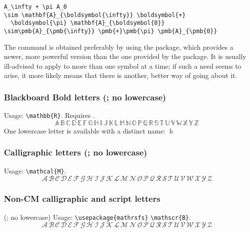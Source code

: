 \begin{verbatim}
A_\infty + \pi A_0
\sim \mathbf{A}_{\boldsymbol{\infty}} \boldsymbol{+}
  \boldsymbol{\pi} \mathbf{A}_{\boldsymbol{0}}
\sim\pmb{A}_{\pmb{\infty}} \pmb{+}\pmb{\pi} \pmb{A}_{\pmb{0}}
\end{verbatim}
The  command is obtained preferably by using
the  package, which provides a newer, more powerful version than
the one provided by the  package. It is usually
ill-advised to apply  to more than one symbol at a time;
if such a need seems to arise, it more likely means that there is
another, better way of going about it.

\subsubsection{Blackboard Bold letters (; no lowercase)}
 Usage: \verb'\mathbb{R}'.  Requires .
\[
\mathbb{A}\,\mathbb{B}\,\mathbb{C}\,\mathbb{D}\,\mathbb{E}\,\mathbb{F}
\,\mathbb{G}\,\mathbb{H}\,\mathbb{I}\,\mathbb{J}\,\mathbb{K}\,\mathbb{L}
\,\mathbb{M}\,\mathbb{N}\,\mathbb{O}\,\mathbb{P}\,\mathbb{Q}\,\mathbb{R}
\,\mathbb{S}\,\mathbb{T}\,\mathbb{U}\,\mathbb{V}\,\mathbb{W}\,\mathbb{X}
\,\mathbb{Y}\,\mathbb{Z}
\]
One lowercase letter is available with a distinct name:\qquad
$\Bbbk$\quad {}


\subsubsection{Calligraphic letters (; no lowercase)} Usage:
\verb'\mathcal{M}'.
\[
\mathcal{A}\,\mathcal{B}\,\mathcal{C}\,\mathcal{D}\,\mathcal{E}
\,\mathcal{F}\,\mathcal{G}\,\mathcal{H}\,\mathcal{I}\,\mathcal{J}
\,\mathcal{K}\,\mathcal{L}\,\mathcal{M}\,\mathcal{N}\,\mathcal{O}
\,\mathcal{P}\,\mathcal{Q}\,\mathcal{R}\,\mathcal{S}\,\mathcal{T}
\,\mathcal{U}\,\mathcal{V}\,\mathcal{W}\,\mathcal{X}\,\mathcal{Y}
\,\mathcal{Z}
\]

\subsubsection{Non-CM calligraphic and script letters}
(; no lowercase) Usage: \verb'\usepackage{mathrsfs}' \verb'\mathscr{B}'.
\[
\mathscr{A}\,\mathscr{B}\,\mathscr{C}\,\mathscr{D}\,\mathscr{E}
\,\mathscr{F}\,\mathscr{G}\,\mathscr{H}\,\mathscr{I}\,\mathscr{J}
\,\mathscr{K}\,\mathscr{L}\,\mathscr{M}\,\mathscr{N}\,\mathscr{O}
\,\mathscr{P}\,\mathscr{Q}\,\mathscr{R}\,\mathscr{S}\,\mathscr{T}
\,\mathscr{U}\,\mathscr{V}\,\mathscr{W}\,\mathscr{X}\,\mathscr{Y}
\,\mathscr{Z}
\]


